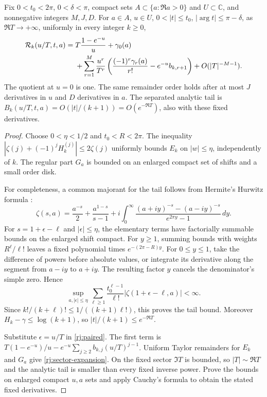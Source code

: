 \begin{theorem}\label{rj:sector}
Fix $0<t_0<2\pi$, $0<\delta<\pi$, compact sets
$A\subset\{a:\Re a>0\}$ and $U\subset\mathbb C$, and nonnegative
integers $M,J,D$. For $a\in A$, $u\in U$,
$0<|t|\le t_0$, $|\arg t|\le\pi-\delta$, as $\Re T\to+\infty$,
uniformly in every integer $k\ge0$,
\begin{align}
 \mathcal R_k(u/T,t,a)
 ={}&T\frac{1-e^{-u}}u+\gamma_0(a)\notag\\
 &+\sum_{r=1}^{M}\frac{u^r}{T^r}
 \left(\frac{(-1)^r\gamma_r(a)}{r!}-e^{-u}b_{k,r+1}\right)
 +O(|T|^{-M-1}).\label{rj:sector-expansion}
\end{align}
The quotient at $u=0$ is one. The same remainder order holds after
at most $J$ derivatives in $u$ and $D$ derivatives in $a$.
The separated analytic tail is $B_k(u/T,t,a)=O(|t|/(k+1))
=O(e^{-\Re T})$, also with these fixed derivatives.
\end{theorem}
\begin{proof}
Choose $0<\eta<1/2$ and $t_0<R<2\pi$. The inequality
$|\zeta(j)+(-1)^jH_k^{(j)}|\le2\zeta(j)$ uniformly bounds $E_k$
on $|w|\le\eta$, independently of $k$. The regular part $G_a$ is
bounded on an enlarged compact set of shifts and a small order disk.

For completeness, a common majorant for the tail follows from Hermite's
Hurwitz formula \cite{intdist:DLMFHurwitz}:
\[
 \zeta(s,a)=\frac{a^{-s}}2+\frac{a^{1-s}}{s-1}
 +i\int_0^\infty
       \frac{(a+iy)^{-s}-(a-iy)^{-s}}{e^{2\pi y}-1}\,dy .
\]
For $s=1+\epsilon-\ell$ and $|\epsilon|\le\eta$, the elementary
terms have factorially summable bounds on the enlarged shift compact.
For $y\ge1$, summing bounds with weights $R^\ell/\ell!$ leaves a
fixed polynomial times $e^{-(2\pi-R)y}$. For $0\le y\le1$, take the
difference of powers before absolute values, or integrate its derivative
along the segment from $a-iy$ to $a+iy$. The resulting factor $y$
cancels the denominator's simple zero. Hence
\[
 \sup_{a,|\epsilon|\le\eta}
 \sum_{\ell\ge1}\frac{t_0^{\ell-1}}{\ell!}
                  |\zeta(1+\epsilon-\ell,a)|<\infty .
\]
Since $k!/(k+\ell)!\le1/((k+1)\ell!)$, this proves the tail bound.
Moreover $H_k-\gamma\le\log(k+1)$, so
$|t|/(k+1)\le e^{-\Re T}$.

Substitute $\epsilon=u/T$ in \eqref{rj:paired}. The first term is
$T(1-e^{-u})/u-e^{-u}\sum_{j\ge2}b_{k,j}(u/T)^{j-1}$.
Uniform Taylor remainders for $E_k$ and $G_a$ give
\eqref{rj:sector-expansion}. On the fixed sector $\Im T$ is bounded,
so $|T|\sim\Re T$ and the analytic tail is smaller than every fixed
inverse power. Prove the bounds on enlarged compact $u,a$ sets and
apply Cauchy's formula to obtain the stated fixed derivatives.
\end{proof}

